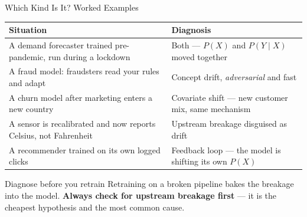 
\begin{frame}{Which Kind Is It? Worked Examples}

    \centering
    \renewcommand{\arraystretch}{1.35}
    {\small
    \begin{tabular}{p{6.4cm}|p{5.0cm}}
        \toprule
        \textbf{Situation} & \textbf{Diagnosis} \\
        \midrule
        A demand forecaster trained pre-pandemic, run during a lockdown &
            Both --- $P(X)$ and $P(Y\mid X)$ moved together \\
        A fraud model: fraudsters read your rules and adapt &
            Concept drift, \emph{adversarial} and fast \\
        A churn model after marketing enters a new country &
            Covariate shift --- new customer mix, same mechanism \\
        A sensor is recalibrated and now reports Celsius, not Fahrenheit &
            Upstream breakage disguised as drift \\
        A recommender trained on its own logged clicks &
            Feedback loop --- the model is shifting its own $P(X)$ \\
        \bottomrule
    \end{tabular}}

    \vspace{0.9em}
    \begin{alertblock}{Diagnose before you retrain}
        Retraining on a broken pipeline bakes the breakage into the model. \textbf{Always check for upstream
        breakage first} --- it is the cheapest hypothesis and the most common cause.
    \end{alertblock}

\end{frame}
